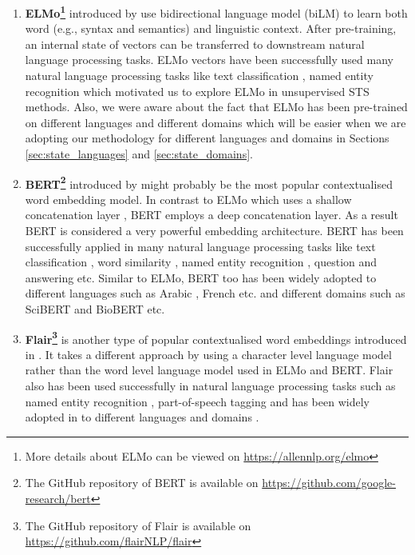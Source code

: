 \begin{enumerate}
\item \textbf{ELMo\footnote{More details about ELMo can be viewed on \url{https://allennlp.org/elmo}}}
introduced by \citet{peters-etal-2018-deep} use bidirectional language model (biLM) to learn both word (e.g., syntax and semantics) and linguistic context. After pre-training, an internal state of vectors can be transferred to downstream natural language processing tasks. ELMo vectors have been successfully used many natural language processing tasks like text classification \cite{jiang-etal-2019-team}, named entity recognition \cite{Luo2018} which motivated us to explore ELMo in unsupervised STS methods. Also, we were aware about the fact that ELMo has been pre-trained on different languages \cite{che-EtAl:2018:K18-2} and different domains \cite{jin2019probing} which will be easier when we are adopting our methodology for different languages and domains in Sections \ref{sec:state_languages} and \ref{sec:state_domains}.

\item \textbf{BERT\footnote{The GitHub repository of BERT is available on \url{https://github.com/google-research/bert}}} introduced by \citet{devlin-etal-2019-bert} might probably be the most popular contextualised word embedding model. In contrast to ELMo which uses a shallow concatenation layer \cite{devlin-etal-2019-bert}, BERT employs a deep concatenation layer. As a result BERT is considered a very powerful embedding architecture. BERT has been successfully applied in many natural language processing tasks like text classification \cite{Ranasinghe2019a}, word similarity \cite{hettiarachchi-etal-2020-brums}, named entity recognition \cite{10.1145/3394486.3403149}, question and answering \cite{yang-etal-2019-end} etc. Similar to ELMo, BERT too has been widely adopted to different languages such as Arabic \cite{antoun-etal-2020-arabert}, French \cite{martin-etal-2020-camembert} etc. and different domains such as SciBERT \cite{beltagy-etal-2019-scibert} and BioBERT \cite{10.1093/bioinformatics/btz682} etc.  

\item \textbf{Flair\footnote{The GitHub repository of Flair is available on \url{https://github.com/flairNLP/flair}}} is another type of popular contextualised word embeddings introduced in \citet{akbik-etal-2018-contextual}. It takes a different approach by using a character level language model rather than the word level language model used in ELMo and BERT. Flair also has been used successfully in natural language processing tasks such as named entity recognition \cite{akbik-etal-2019-pooled}, part-of-speech tagging \cite{akbik-etal-2018-contextual} and has been widely adopted in to different languages and domains \cite{akbik-etal-2018-contextual,sharma2019bioflair}.

\end{enumerate}

